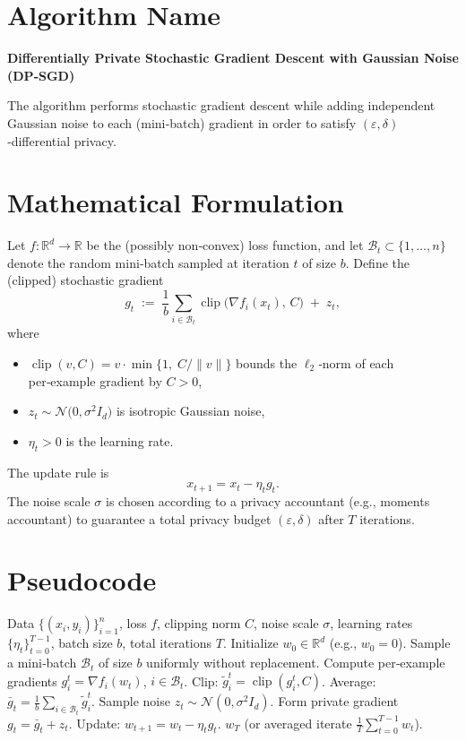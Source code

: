 \documentclass[11pt]{article}
\newcommand{\R}{\mathbb{R}}
\newcommand{\grad}{\nabla}
\begin{document}
\section*{Algorithm Name}
\textbf{Differentially Private Stochastic Gradient Descent with Gaussian Noise (DP‑SGD)}  

The algorithm performs stochastic gradient descent while adding independent Gaussian noise to each (mini‑batch) gradient in order to satisfy $(\varepsilon,\delta)$‑differential privacy.

\section*{Mathematical Formulation}
Let $f:\R^{d}\rightarrow\R$ be the (possibly non‑convex) loss function, and let $\mathcal{B}_{t}\subset\{1,\dots,n\}$ denote the random mini‑batch sampled at iteration $t$ of size $b$.  
Define the (clipped) stochastic gradient
\[
g_{t}\;:=\;\frac{1}{b}\sum_{i\in\mathcal{B}_{t}}\operatorname{clip}\!\bigl(\grad f_{i}(x_{t}),\,C\bigr)\;+\;z_{t},
\]
where 
\begin{itemize}[noitemsep,topsep=0pt]
\item $\operatorname{clip}(v,C)=v\cdot \min\!\bigl\{1,\;C/\|v\|\bigr\}$ bounds the $\ell_{2}$‑norm of each per‑example gradient by $C>0$,
\item $z_{t}\sim\mathcal{N}\!\bigl(0,\sigma^{2}I_{d}\bigr)$ is isotropic Gaussian noise,
\item $\eta_{t}>0$ is the learning rate.
\end{itemize}
The update rule is
\begin{equation}
x_{t+1}=x_{t}-\eta_{t}g_{t}.
\tag{1}
\end{equation}
The noise scale $\sigma$ is chosen according to a privacy accountant (e.g., moments accountant) to guarantee a total privacy budget $(\varepsilon,\delta)$ after $T$ iterations.

\section*{Pseudocode}
\begin{algorithm}[H]
\caption{DP‑SGD with Gaussian Noise}
\begin{algorithmic}[1]
\Require Data $\{(x_i,y_i)\}_{i=1}^{n}$, loss $f$, clipping norm $C$, noise scale $\sigma$, learning rates $\{\eta_{t}\}_{t=0}^{T-1}$, batch size $b$, total iterations $T$.
\State Initialize $w_{0}\in\R^{d}$ (e.g., $w_{0}=0$).
    \State Sample a mini‑batch $\mathcal{B}_{t}$ of size $b$ uniformly without replacement.
    \State Compute per‑example gradients $g_{i}^{t}=\grad f_{i}(w_{t})$, $i\in\mathcal{B}_{t}$.
    \State Clip: $\tilde g_{i}^{t}= \operatorname{clip}(g_{i}^{t},C)$.
    \State Average: $\bar g_{t}= \frac{1}{b}\sum_{i\in\mathcal{B}_{t}}\tilde g_{i}^{t}$.
    \State Sample noise $z_{t}\sim\mathcal{N}(0,\sigma^{2}I_{d})$.
    \State Form private gradient $g_{t}= \bar g_{t}+z_{t}$.
    \State Update: $w_{t+1}= w_{t}-\eta_{t} g_{t}$.
\EndFor
\State \Return $w_{T}$ (or averaged iterate $\frac{1}{T}\sum_{t=0}^{T-1}w_{t}$).
\end{algorithmic}
\end{algorithm}
\end{document}
